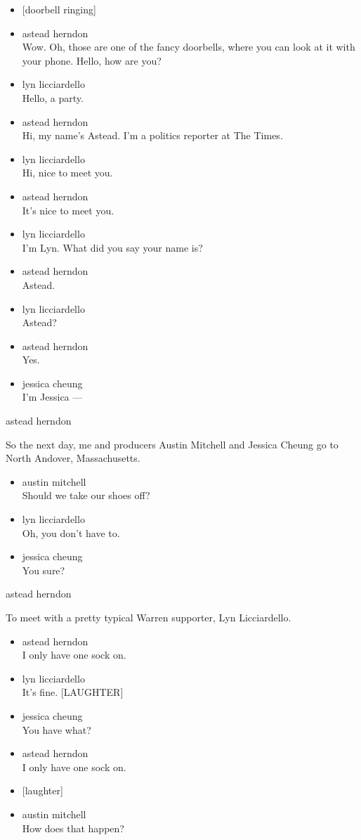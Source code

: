 \begin{itemize}
\item
  {[}doorbell ringing{]}
\item
  astead herndon\\
  Wow. Oh, those are one of the fancy doorbells, where you can look at
  it with your phone. Hello, how are you?
\item
  lyn licciardello\\
  Hello, a party.
\item
  astead herndon\\
  Hi, my name's Astead. I'm a politics reporter at The Times.
\item
  lyn licciardello\\
  Hi, nice to meet you.
\item
  astead herndon\\
  It's nice to meet you.
\item
  lyn licciardello\\
  I'm Lyn. What did you say your name is?
\item
  astead herndon\\
  Astead.
\item
  lyn licciardello\\
  Astead?
\item
  astead herndon\\
  Yes.
\item
  jessica cheung\\
  I'm Jessica ---
\end{itemize}

astead herndon

So the next day, me and producers Austin Mitchell and Jessica Cheung go
to North Andover, Massachusetts.

\begin{itemize}
\item
  austin mitchell\\
  Should we take our shoes off?
\item
  lyn licciardello\\
  Oh, you don't have to.
\item
  jessica cheung\\
  You sure?
\end{itemize}

astead herndon

To meet with a pretty typical Warren supporter, Lyn Licciardello.

\begin{itemize}
\item
  astead herndon\\
  I only have one sock on.
\item
  lyn licciardello\\
  It's fine. {[}LAUGHTER{]}
\item
  jessica cheung\\
  You have what?
\item
  astead herndon\\
  I only have one sock on.
\item
  {[}laughter{]}
\item
  austin mitchell\\
  How does that happen?
\end{itemize}

